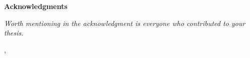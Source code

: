 \thispagestyle{empty}

\begin{center}
{\Large \textbf{\sc Acknowledgments}}
\end{center}
\vspace{0.5cm}

{\it\noindent
Worth mentioning in the acknowledgment is everyone who contributed to your thesis.

\vspace{0.5cm} \hfill \tauthor, \myyear
}